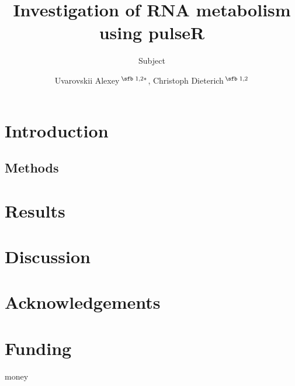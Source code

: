 \documentclass{bioinfo}
\begin{document}

\subtitle{Subject}

\title[pulseR package]{Investigation of RNA metabolism using pulseR}
\author[Uvarovskii \textit{et~al}.]{
Uvarovskii Alexey\,$^{\text{\sfb 1,2}*}$,
Christoph Dieterich\,$^{\text{\sfb 1,2}}$ }
\address{$^{\text{\sf 1}}$
Section of Bioinformatics and Systems Cardiology
Klaus Tschira Institute for Integrative Computational Cardiology
Department of Internal Medicine III
University Hospital Heidelberg,   
Im Neuenheimer Feld 669
69120 Heidelberg,
and 
$^{\text{\sf 2}}$
German Center for Cardiovascular Research (DZHK),
Im Neuenheimer Feld 669
69120 Heidelberg
}




\maketitle

\section{Introduction}

\begin{methods}
\section{Methods}

\end{methods}

\section{Results}


\section{Discussion}



\section*{Acknowledgements}

\section*{Funding}
money	

%
%

%
%
%
%
%

\end{document}
